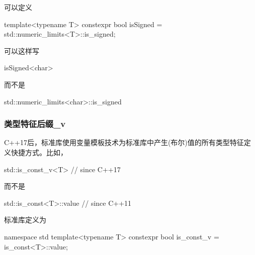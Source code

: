 可以定义

\begin{cpp}
template<typename T>
constexpr bool isSigned = std::numeric_limits<T>::is_signed;
\end{cpp}

可以这样写

\begin{cpp}
isSigned<char>
\end{cpp}

而不是

\begin{cpp}
std::numeric_limits<char>::is_signed
\end{cpp}

\subsubsection{类型特征后缀\_v}

C++17后，标准库使用变量模板技术为标准库中产生(布尔)值的所有类型特征定义快捷方式。比如，

\begin{cpp}
std::is_const_v<T> // since C++17
\end{cpp}

而不是

\begin{cpp}
std::is_const<T>::value // since C++11
\end{cpp}

标准库定义为

\begin{cpp}
namespace std {
	template<typename T> constexpr bool is_const_v = is_const<T>::value;
}
\end{cpp}






















